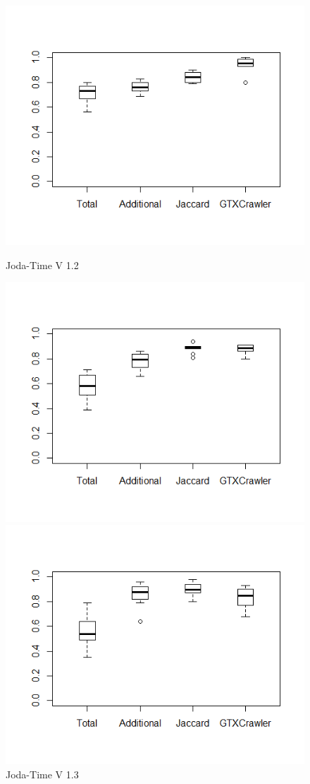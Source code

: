 \begin{figure}[!hb]
	\includegraphics[width=0.95\linewidth]{./joda3.png}
	\caption*{Joda-Time V 1.2}
	\label{fig:joda3}
	\endminipage\hfill		
	\includegraphics[width=0.95\linewidth]{./joda4.png}
	\caption*{Joda-Time V 1.3}
	\label{fig:joda4}
	\endminipage\hfill
	\includegraphics[width=0.95\linewidth]{./joda5.png}

\end{figure}
